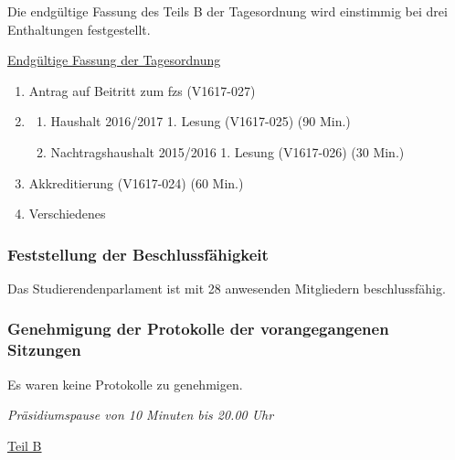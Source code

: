 \documentclass[ngerman,headheight=70pt]{scrartcl}
\begin{document}
    Die endgültige Fassung des Teils B der Tagesordnung wird einstimmig bei drei
    Enthaltungen festgestellt.

    \underline{Endgültige Fassung der Tagesordnung}
    \begin{enumerate}[label={\textbf{Top \theenumi}},leftmargin=*]
        \item Antrag auf Beitritt zum fzs (V1617-027)
        \item
            \begin{enumerate}
                \item Haushalt 2016/2017 1. Lesung (V1617-025) (90 Min.)
                \item Nachtragshaushalt 2015/2016 1. Lesung (V1617-026) (30 Min.)
            \end{enumerate}
        \item Akkreditierung (V1617-024) (60 Min.)
        \item Verschiedenes
    \end{enumerate}

    \subsubsection{Feststellung der Beschlussfähigkeit}

    Das Studierendenparlament ist mit 28 anwesenden Mitgliedern beschlussfähig.

    \subsubsection{Genehmigung der Protokolle der vorangegangenen Sitzungen}

    Es waren keine Protokolle zu genehmigen.

    \textit{Präsidiumspause von 10 Minuten bis 20.00 Uhr}

    \newpage
    {\Large \underline{Teil B}}


\end{document}
